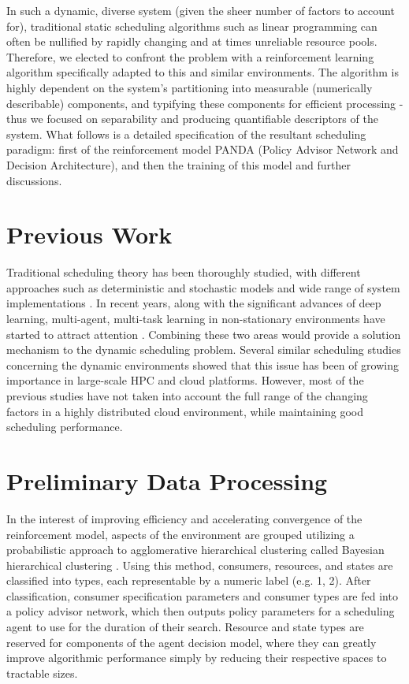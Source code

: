 \documentclass{article}
\theoremstyle{definition}
\theoremstyle{remark}
\begin{document}
	In such a dynamic, diverse system (given the sheer number of factors to account	for), traditional static scheduling algorithms such as linear programming can often be nullified by rapidly changing and at times unreliable resource pools. Therefore, we elected to confront the problem with a reinforcement learning algorithm specifically adapted to this and similar environments. The algorithm is highly dependent on the system's partitioning into measurable (numerically describable) components, and typifying these components for efficient processing - thus we focused on separability and producing quantifiable descriptors of the system. What follows is a detailed specification of the resultant scheduling paradigm: first of the reinforcement model PANDA (Policy Advisor Network and Decision Architecture), and then the training of this model and further discussions.


	\section{Previous Work}
	
	Traditional scheduling theory has been thoroughly studied, with different approaches such as deterministic and stochastic models and wide range of system implementations \cite{pinedo2016scheduling}. In recent years, along with the significant advances of deep learning, multi-agent, multi-task learning in non-stationary environments have started to attract attention \cite{al2017continuous, omidshafiei2017deep, foerster2016learning, tampuu2017multiagent, bansal2017emergent, frans2017meta}. Combining these two areas would provide a solution mechanism to the dynamic scheduling problem. Several similar scheduling studies concerning the dynamic environments \cite{tang2009fault, carastan2017obtaining} showed that this issue has been of growing importance in large-scale HPC and cloud platforms. However, most of the previous studies have not taken into account the full range of the changing factors in a highly distributed cloud environment, while maintaining good scheduling performance.
	
	\section{Preliminary Data Processing}
	
	In the interest of improving efficiency and accelerating convergence of the reinforcement model, aspects of the environment are grouped utilizing a probabilistic approach to agglomerative hierarchical clustering called Bayesian hierarchical clustering \cite{heller2005clustering}. Using this method, consumers, resources, and states are classified into types, each representable by a numeric label (e.g. 1, 2). After classification, consumer specification parameters and consumer types are fed into a policy advisor network, which then outputs policy parameters for a scheduling agent to use for the duration of their search. Resource and state types are reserved for components of the agent decision model, where they can greatly improve algorithmic performance simply by reducing their respective spaces to tractable sizes.
\end{document}
